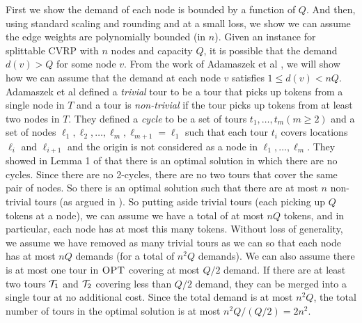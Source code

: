 \documentclass[twoside,leqno]{article}
\newcommand{\calT}{{\cal T}}
\newcommand{\OPT}{\mbox{\sc OPT}}
\begin{document}
 First we show the demand of each node is bounded by a function of $Q$. And then,
using standard scaling and rounding and at a small loss, we show we can assume the edge weights are polynomially bounded (in $n$).   Given an instance for splittable CVRP with $n$ nodes and capacity $Q$, it is possible that the demand $d(v) > Q$ for some node $v$. From the work of Adamaszek et al \cite{AdamaszekCL09}, we will show how we can assume that the demand at each node $v$ satisfies $1 \le d(v) < nQ$. Adamaszek et al \cite{AdamaszekCL09} defined a \emph{trivial} tour to be a tour that picks up tokens from a single node in $T$ and a tour is \emph{non-trivial} if the tour picks up tokens from at least two nodes in $T$. They defined a \emph{cycle} to be a set of tours $t_1,\ldots, t_m (m \ge 2)$ and a set of nodes $\ell_1, \ell_2, \ldots, \ell_m, \ell_{m+1} = \ell_1$ such that each tour $t_i$ covers locations $\ell_i$ and $\ell_{i+1}$ and the origin is not considered as a node in $\ell_1, \ldots, \ell_m$.  They showed in Lemma 1 of \cite{AdamaszekCL09} that there is an optimal solution in which there are no cycles. Since there are no 2-cycles, there are no two tours that cover the same pair of nodes. So there is an optimal solution such that there are at most $n$ non-trivial tours (as argued in \cite{AdamaszekCL09}). So putting aside trivial tours (each picking up $Q$ tokens at a node), we can assume we have a total of at most $nQ$ tokens, and in particular, each node has at most this many tokens. Without loss of generality, we assume we have removed as many trivial tours as we can so that each node has at most $nQ$ demands (for a total of $n^2Q$ demands).
We can also assume there is at most one tour in $\OPT$ covering at most $Q/2$ demand. If there are at least two tours $\calT_1$ and $\calT_2$ covering less than $Q/2$ demand, they can be merged into a single tour at no additional cost. Since the total demand is at most $n^2Q$, the total number of tours in the optimal solution is at most $n^2Q/(Q/2) = 2n^2$.
\end{document}
